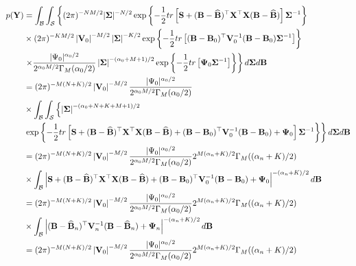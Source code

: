 \begin{align*}
	p({\bf{Y}})&=\int_{\mathcal{B}}\int_{\mathcal{S}}\left\{ (2\pi)^{-NM/2} |{{\bf \Sigma}}|^{-N/2}\exp\left\lbrace -\frac{1}{2}tr\left[{\bf{S}}+({\bf{B}}-\widehat{\bf{B}})^{\top}{\bf{X}}^{\top}{\bf{X}}({\bf{B}}-\widehat{\bf{B}})\right]{{\bf \Sigma}}^{-1}\right\rbrace\right.\\
	&\times (2\pi)^{-KM/2}\left|{\bf V}_0 \right|^{-M/2} \left|{\bm{\Sigma}} \right|^{-K/2}\exp\left\lbrace -\frac{1}{2}tr\left[({\bf{B}}-{\bf{B}}_{0})^{\top}{\bf{V}}_{0}^{-1}({\bf{B}}-{\bf{B}}_{0}){\bf \Sigma}^{-1}\right]\right\rbrace \\
	&\left. \times \frac{|\Psi_0|^{\alpha_0/2}}{2^{\alpha_0M/2}\Gamma_M(\alpha_0/2)} \left|{\bf \Sigma} \right|^{-(\alpha_{0}+M+1)/2}\exp\left\lbrace -\frac{1}{2}tr \left[ {\bf{\Psi}}_{0} {\bf \Sigma}^{-1}\right] \right\rbrace \right\} d{\bm{\Sigma}} d{\bf B}\\
	&=(2\pi)^{-M(N+K)/2}\left|{\bf V}_0\right|^{-M/2}\frac{|\Psi_0|^{\alpha_0/2}}{2^{\alpha_0M/2}\Gamma_M(\alpha_0/2)}\\
	&\times\int_{\mathcal{B}}\int_{\mathcal{S}} \left\{ \left|{\bf \Sigma} \right|^{-(\alpha_{0}+N+K+M+1)/2}\right.\\
	&\left. \exp\left\lbrace -\frac{1}{2}tr\left[{\bf{S}}+({\bf{B}}-\widehat{\bf{B}})^{\top}{\bf{X}}^{\top}{\bf{X}}({\bf{B}}-\widehat{\bf{B}})+({\bf{B}}-{\bf{B}}_{0})^{\top}{\bf{V}}_{0}^{-1}({\bf{B}}-{\bf{B}}_{0})+{\bf{\Psi}}_0\right]{{\bf \Sigma}}^{-1}\right\rbrace\right\}d{\bm{\Sigma}} d{\bf B}\\
	&=(2\pi)^{-M(N+K)/2}\left|{\bf V}_0\right|^{-M/2}\frac{|\Psi_0|^{\alpha_0/2}}{2^{\alpha_0M/2}\Gamma_M(\alpha_0/2)}2^{M(\alpha_n+K)/2}\Gamma_M((\alpha_n+K)/2)\\
	&\times \int_{\mathcal{B}}\left|{\bf{S}}+({\bf{B}}-\widehat{\bf{B}})^{\top}{\bf{X}}^{\top}{\bf{X}}({\bf{B}}-\widehat{\bf{B}})+({\bf{B}}-{\bf{B}}_{0})^{\top}{\bf{V}}_{0}^{-1}({\bf{B}}-{\bf{B}}_{0})+{\bf{\Psi}}_0\right|^{-(\alpha_n+K)/2}d{\bf{B}}\\
	&=(2\pi)^{-M(N+K)/2}\left|{\bf V}_0\right|^{-M/2}\frac{|\Psi_0|^{\alpha_0/2}}{2^{\alpha_0M/2}\Gamma_M(\alpha_0/2)}2^{M(\alpha_n+K)/2}\Gamma_M((\alpha_n+K)/2)\\
	&\times \int_{\mathcal{B}}\left|({\bf{B}}-\widehat{\bf{B}}_n)^{\top}{\bf{V}}_n^{-1}({\bf{B}}-\widehat{\bf{B}}_n)+{\bf{\Psi}}_n\right|^{-(\alpha_n+K)/2}d{\bf{B}}\\ 
	&=(2\pi)^{-M(N+K)/2}\left|{\bf V}_0\right|^{-M/2}\frac{|\Psi_0|^{\alpha_0/2}}{2^{\alpha_0M/2}\Gamma_M(\alpha_0/2)}2^{M(\alpha_n+K)/2}\Gamma_M((\alpha_n+K)/2)\\

\end{align*}
